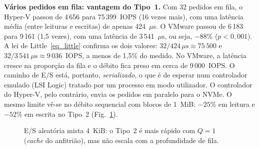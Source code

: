 \documentclass[conference]{IEEEtran}
\begin{document}
\textbf{Vários pedidos em fila: vantagem do Tipo~1.} Com 32 pedidos em fila, o Hyper-V passou de 4\,656 para 75\,399~IOPS (16 vezes mais), com uma latência média (entre leituras e escritas) de apenas 424~$\mu$s. O VMware passou de 6\,183 para 9\,161 (1,5 vezes), com uma latência de 3\,541~$\mu$s, ou seja, $-88\%$ ($p<0{,}001$). A lei de Little~\eqref{eq_little} confirma os dois valores: $32/424\,\mu\mathrm{s}\approx75\,500$ e $32/3\,541\,\mu\mathrm{s}\approx9\,036$~IOPS, a menos de 1,5\% do medido. No VMware, a latência cresce na proporção da fila e o débito fica preso em cerca de 9\,000~IOPS. O caminho de E/S está, portanto, \textit{serializado}, o que é de esperar num controlador emulado (LSI Logic) tratado por um processo em modo utilizador. O controlador do Hyper-V, pelo contrário, envia os pedidos em paralelo para o NVMe. O mesmo limite vê-se no débito sequencial com blocos de 1~MiB: $-25\%$ em leitura e $-52\%$ em escrita no Tipo~2 (Fig.~\ref{fig_disco}).

\begin{figure}[t]
\centering
{}
\caption{E/S aleatória mista 4~KiB: o Tipo~2 é mais rápido com $Q=1$ (\textit{cache} do anfitrião), mas não escala com a profundidade de fila.}
\label{fig_disco}
\end{figure}
\end{document}
